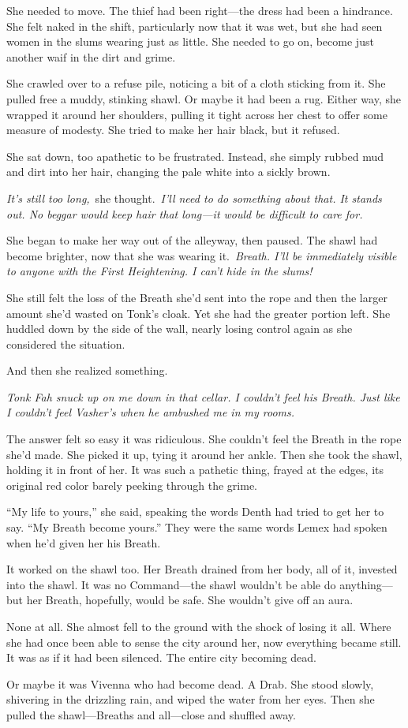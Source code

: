 She needed to move. The thief had been right—the dress had been a hindrance. She felt naked in the shift, particularly now that it was wet, but she had seen women in the slums wearing just as little. She needed to go on, become just another waif in the dirt and grime.

She crawled over to a refuse pile, noticing a bit of a cloth sticking from it. She pulled free a muddy, stinking shawl. Or maybe it had been a rug. Either way, she wrapped it around her shoulders, pulling it tight across her chest to offer some measure of modesty. She tried to make her hair black, but it refused.

She sat down, too apathetic to be frustrated. Instead, she simply rubbed mud and dirt into her hair, changing the pale white into a sickly brown.

\textit{It’s still too long,}~she thought.~\textit{I’ll need to do something about that. It stands out. No beggar would keep hair that long—it would be difficult to care for.}

She began to make her way out of the alleyway, then paused. The shawl had become brighter, now that she was wearing it.~\textit{Breath. I’ll be immediately visible to anyone with the First Heightening. I can’t hide in the slums!}

She still felt the loss of the Breath she’d sent into the rope and then the larger amount she’d wasted on Tonk’s cloak. Yet she had the greater portion left. She huddled down by the side of the wall, nearly losing control again as she considered the situation.

And then she realized something.

\textit{Tonk Fah snuck up on me down in that cellar. I couldn’t feel his Breath. Just like I couldn’t feel Vasher’s when he ambushed me in my rooms.}

The answer felt so easy it was ridiculous. She couldn’t feel the Breath in the rope she’d made. She picked it up, tying it around her ankle. Then she took the shawl, holding it in front of her. It was such a pathetic thing, frayed at the edges, its original red color barely peeking through the grime.

“My life to yours,” she said, speaking the words Denth had tried to get her to say. “My Breath become yours.” They were the same words Lemex had spoken when he’d given her his Breath.

It worked on the shawl too. Her Breath drained from her body, all of it, invested into the shawl. It was no Command—the shawl wouldn’t be able do anything—but her Breath, hopefully, would be safe. She wouldn’t give off an aura.

None at all. She almost fell to the ground with the shock of losing it all. Where she had once been able to sense the city around her, now everything became still. It was as if it had been silenced. The entire city becoming dead.

Or maybe it was Vivenna who had become dead. A Drab. She stood slowly, shivering in the drizzling rain, and wiped the water from her eyes. Then she pulled the shawl—Breaths and all—close and shuffled away.


